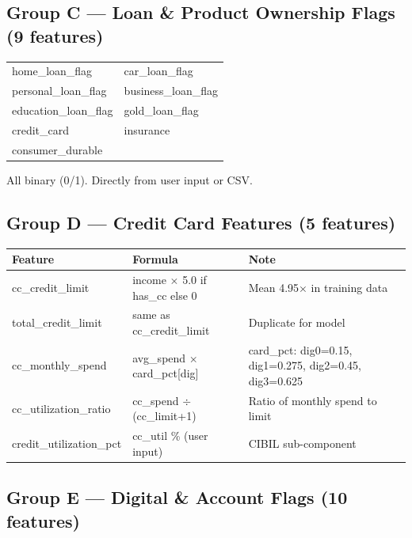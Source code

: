\documentclass[12pt,a4paper]{article}
\begin{document}
\subsection{Group C — Loan \& Product Ownership Flags (9 features)}

\begin{tabular}{ll}
\toprule
home\_loan\_flag & car\_loan\_flag \\
personal\_loan\_flag & business\_loan\_flag \\
education\_loan\_flag & gold\_loan\_flag \\
credit\_card & insurance \\
consumer\_durable & \\
\bottomrule
\end{tabular}

All binary (0/1). Directly from user input or CSV.

\subsection{Group D — Credit Card Features (5 features)}

\begin{tabular}{lll}
\toprule
\textbf{Feature} & \textbf{Formula} & \textbf{Note} \\
\midrule
cc\_credit\_limit & income $\times$ 5.0 if has\_cc else 0 & Mean 4.95$\times$ in training data \\
total\_credit\_limit & same as cc\_credit\_limit & Duplicate for model \\
cc\_monthly\_spend & avg\_spend $\times$ card\_pct[dig] & card\_pct: dig0=0.15, dig1=0.275, dig2=0.45, dig3=0.625 \\
cc\_utilization\_ratio & cc\_spend $\div$ (cc\_limit+1) & Ratio of monthly spend to limit \\
credit\_utilization\_pct & cc\_util \% (user input) & CIBIL sub-component \\
\bottomrule
\end{tabular}

\subsection{Group E — Digital \& Account Flags (10 features)}
\end{document}
